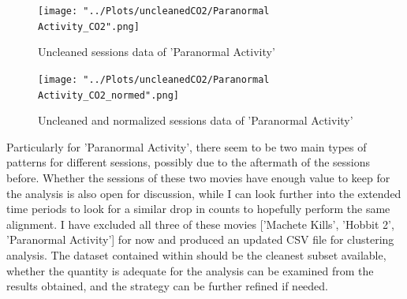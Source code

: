 \documentclass[letterpaper, 10 pt, conference]{ieeeconf}  %
\begin{document}
\begin{figure}[thpb]
  \centering
  \texttt{[image: "../Plots/uncleanedCO2/Paranormal Activity\_CO2".png]}
  \caption{Uncleaned sessions data of 'Paranormal Activity'}
  \label{ParanormalActivityUncleaned}
\end{figure}

\begin{figure}[thpb]
  \centering
  \texttt{[image: "../Plots/uncleanedCO2/Paranormal Activity\_CO2\_normed".png]}
  \caption{Uncleaned and normalized sessions data of 'Paranormal Activity'}
  \label{ParanormalActivityUncleanedNormed}
\end{figure}

Particularly for 'Paranormal Activity', there seem to be two main types of patterns for different sessions, possibly due to the aftermath of the sessions before. Whether the sessions of these two movies have enough value to keep for the analysis is also open for discussion, while I can look further into the extended time periods to look for a similar drop in counts to hopefully perform the same alignment. I have excluded all three of these movies ['Machete Kills', 'Hobbit 2', 'Paranormal Activity'] for now and produced an updated CSV file for clustering analysis. The dataset contained within should be the cleanest subset available, whether the quantity is adequate for the analysis can be examined from the results obtained, and the strategy can be further refined if needed.

\addtolength{\textheight}{-12cm}   %







\end{document}
